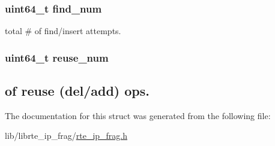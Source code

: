 \subsubsection[{find\+\_\+num}]{\setlength{\rightskip}{0pt plus 5cm}uint64\+\_\+t find\+\_\+num}\label{structip__frag__tbl__stat_acb8aad396c4da244c3da7858b23296a9}
total \# of find/insert attempts. \hypertarget{structip__frag__tbl__stat_a313c5e12dac5182293b7d202e5be36e5}{}
\subsubsection[{reuse\+\_\+num}]{\setlength{\rightskip}{0pt plus 5cm}uint64\+\_\+t reuse\+\_\+num}\label{structip__frag__tbl__stat_a313c5e12dac5182293b7d202e5be36e5}
\subsection*{of reuse (del/add) ops.}

The documentation for this struct was generated from the following file\+:\begin{DoxyCompactItemize}
\item 
lib/librte\+\_\+ip\+\_\+frag/\hyperlink{rte__ip__frag_8h}{rte\+\_\+ip\+\_\+frag.\+h}\end{DoxyCompactItemize}
